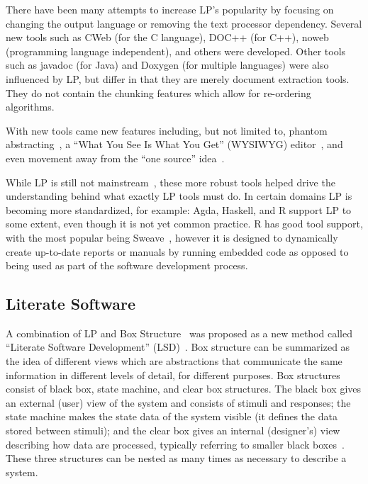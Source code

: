 There have been many attempts to increase LP's popularity by focusing on 
changing the output language or removing the text processor dependency. Several
new tools such as CWeb (for the C language), DOC++ (for C++), noweb 
(programming language independent), and others were developed. Other tools such 
as javadoc (for Java) and Doxygen (for multiple languages) were also influenced 
by LP, but differ in that they are merely document extraction tools. They do 
not contain the chunking features which allow for re-ordering algorithms.

With new tools came new features including, but not limited to, phantom
abstracting~\cite{ShumAndCook1993}, a ``What You See Is What You Get'' (WYSIWYG)
editor~\cite{FritzsonGunnarssonAndJirstrand2002}, and even movement away from 
the ``one source'' idea~\cite{Simonis2003}.

While LP is still not mainstream~\cite{Ramsey1994}, these more robust 
tools helped drive the understanding behind what exactly LP tools must 
do. In certain domains LP is becoming more standardized, for 
example: Agda, Haskell, and R support LP to some extent, even though it is not 
yet common practice. R has good tool support, with the most popular being
Sweave~\cite{Leisch2002}, however it is designed to dynamically create
up-to-date reports or manuals by running embedded code as opposed to being used
as part of the software development process. 

\subsection{Literate Software}

A combination of LP and Box Structure~\cite{Mills1986} was proposed as a new
method called ``Literate Software Development''
(LSD)~\cite{AlMatiiAndBoujarwah2002}. Box structure can be summarized as the
idea of different views which are abstractions that communicate the same
information in different levels of detail, for different purposes. Box
structures consist of black box, state machine, and clear box structures. The
black box gives an external (user) view of the system and consists of stimuli
and responses; the state machine makes the state data of the system visible (it
defines the data stored between stimuli); and the clear box gives an internal
(designer's) view describing how data are processed, typically referring to
smaller black boxes~\cite{Mills1986}. These three structures can be nested as
many times as necessary to describe a system.


